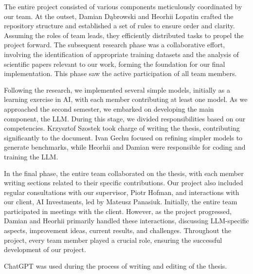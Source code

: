 The entire project consisted of various components meticulously coordinated by our team. At the outset, Damian Dąbrowski and Heorhii Lopatin crafted the repository structure and established a set of rules to ensure order and clarity. Assuming the roles of team leads, they efficiently distributed tasks to propel the project forward. The subsequent research phase was a collaborative effort, involving the identification of appropriate training datasets and the analysis of scientific papers relevant to our work, forming the foundation for our final implementation. This phase saw the active participation of all team members.

Following the research, we implemented several simple models, initially as a learning exercise in AI, with each member contributing at least one model. As we approached the second semester, we embarked on developing the main component, the LLM. During this stage, we divided responsibilities based on our competencies. Krzysztof Szostek took charge of writing the thesis, contributing significantly to the document. Ivan Gechu focused on refining simpler models to generate benchmarks, while Heorhii and Damian were responsible for coding and training the LLM.

In the final phase, the entire team collaborated on the thesis, with each member writing sections related to their specific contributions. Our project also included regular consultations with our supervisor, Piotr Hofman, and interactions with our client, AI Investments, led by Mateusz Panasiuk. Initially, the entire team participated in meetings with the client. However, as the project progressed, Damian and Heorhii primarily handled these interactions, discussing LLM-specific aspects, improvement ideas, current results, and challenges. Throughout the project, every team member played a crucial role, ensuring the successful development of our project.

ChatGPT was used during the process of writing and editing of the thesis.
